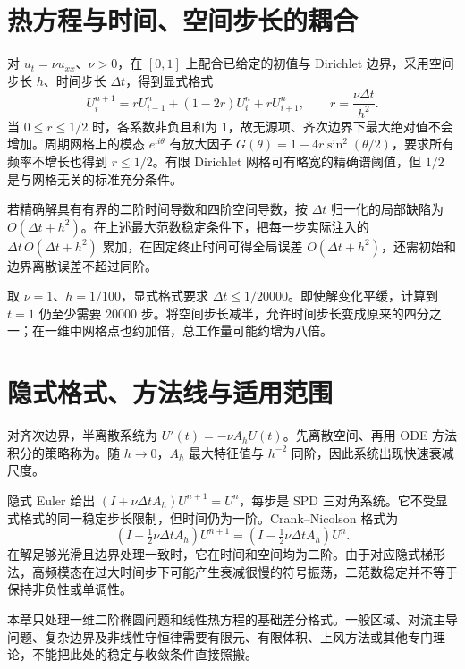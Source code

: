 \documentclass[UTF8,12pt,a4paper,fontset=fandol]{ctexbook}
\begin{document}
\section{热方程与时间、空间步长的耦合}
对 $u_t=\nu u_{xx}$、$\nu>0$，在 $[0,1]$ 上配合已给定的初值与 Dirichlet 边界，采用空间步长 $h$、时间步长 $\Delta t$，得到显式格式
\begin{equation}
 U_i^{n+1}=rU_{i-1}^n+(1-2r)U_i^n+rU_{i+1}^n,
 \qquad r=\frac{\nu\Delta t}{h^2}.
 \label{eq:na-heat-explicit}
\end{equation}
当 $0\le r\le1/2$ 时，各系数非负且和为 $1$，故无源项、齐次边界下最大绝对值不会增加。周期网格上的模态 $e^{\mathrm i i\theta}$ 有放大因子 $G(\theta)=1-4r\sin^2(\theta/2)$，要求所有频率不增长也得到 $r\le1/2$。有限 Dirichlet 网格可有略宽的精确谱阈值，但 $1/2$ 是与网格无关的标准充分条件。

若精确解具有有界的二阶时间导数和四阶空间导数，按 $\Delta t$ 归一化的局部缺陷为 $O(\Delta t+h^2)$。在上述最大范数稳定条件下，把每一步实际注入的 $\Delta t\,O(\Delta t+h^2)$ 累加，在固定终止时间可得全局误差 $O(\Delta t+h^2)$，还需初始和边界离散误差不超过同阶。

\begin{example}[稳定约束的实际代价]
取 $\nu=1$、$h=1/100$，显式格式要求 $\Delta t\le1/20000$。即使解变化平缓，计算到 $t=1$ 仍至少需要 $20000$ 步。将空间步长减半，允许时间步长变成原来的四分之一；在一维中网格点也约加倍，总工作量可能约增为八倍。
\end{example}

\section{隐式格式、方法线与适用范围}
对齐次边界，半离散系统为 $U'(t)=-\nu A_hU(t)$。先离散空间、再用 ODE 方法积分的策略称为。随 $h\to0$，$A_h$ 最大特征值与 $h^{-2}$ 同阶，因此系统出现快速衰减尺度。

隐式 Euler 给出 $(I+\nu\Delta t A_h)U^{n+1}=U^n$，每步是 SPD 三对角系统。它不受显式格式的同一稳定步长限制，但时间仍为一阶。Crank--Nicolson 格式为
\[
 (I+\tfrac12\nu\Delta t A_h)U^{n+1}
 =(I-\tfrac12\nu\Delta t A_h)U^n.
\]
在解足够光滑且边界处理一致时，它在时间和空间均为二阶。由于对应隐式梯形法，高频模态在过大时间步下可能产生衰减很慢的符号振荡，二范数稳定并不等于保持非负性或单调性。

本章只处理一维二阶椭圆问题和线性热方程的基础差分格式。一般区域、对流主导问题、复杂边界及非线性守恒律需要有限元、有限体积、上风方法或其他专门理论，不能把此处的稳定与收敛条件直接照搬。
\end{document}
